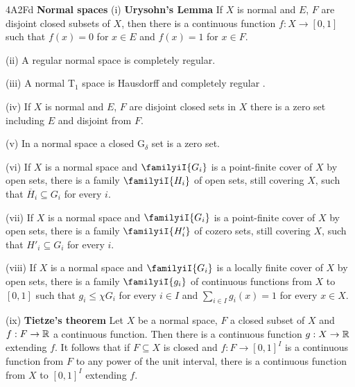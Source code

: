 \spheader 4A2Fd {\bf Normal spaces} (i) {\bf Urysohn's Lemma}  If
$X$ is normal and $E$, $F$ are disjoint closed
subsets of $X$, then there is a continuous function $f:X\to[0,1]$ such
that $f(x)=0$ for $x\in E$ and $f(x)=1$ for $x\in F$.

\quad (ii) A regular normal space is completely regular.

\quad (iii) A normal T$_1$ space is Hausdorff
and completely regular
.

\quad (iv) If $X$ is normal and $E$, $F$ are disjoint closed sets in $X$
there is a zero set including $E$ and disjoint from $F$.

\quad (v) In a normal space a closed G$_{\delta}$ set is a zero set.

\quad (vi) If $X$ is a normal space and $\familyiI{G_i}$ is a
point-finite cover of $X$ by open sets, there is a family
$\familyiI{H_i}$ of open
sets, still covering $X$, such that $\overline{H}_i\subseteq G_i$ for
every $i$.

\quad (vii) If $X$ is a normal space and $\familyiI{G_i}$ is a
point-finite cover of $X$ by open sets, there is a family
$\familyiI{H'_i}$ of cozero
sets, still covering $X$, such that $H'_i\subseteq G_i$ for every $i$.

\quad (viii) If $X$ is a normal space and $\familyiI{G_i}$ is a
locally finite cover of $X$ by open sets, there is a family
$\familyiI{g_i}$ of continuous functions from $X$ to $[0,1]$ such that
$g_i\le\chi G_i$ for every $i\in I$ and $\sum_{i\in I}g_i(x)=1$ for
every $x\in X$.   

\quad (ix) {\bf Tietze's theorem} Let 
$X$ be a normal space, $F$ a
closed subset of $X$ and $f:F\to\Bbb R$ a continuous function.   Then
there is a continuous function $g:X\to\Bbb R$ extending $f$.
It follows that if $F\subseteq X$ is closed and $f:F\to[0,1]^I$ is a
continuous function from $F$ to any power of the unit interval, there is
a continuous function from $X$ to $[0,1]^I$ extending $f$.

